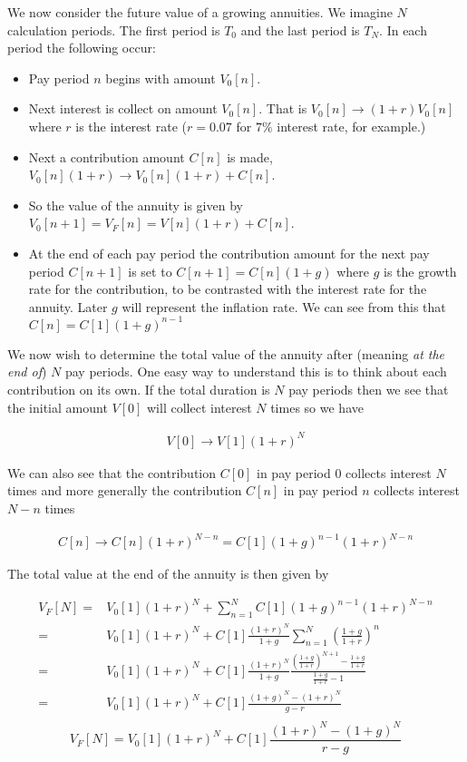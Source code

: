 \documentclass[12pt]{article}
\begin{document}
We now consider the future value of a growing annuities. 
We imagine $N$ calculation periods. 
The first period is $T_0$ and the last period is $T_N$. 
In each period the following occur:

\begin{itemize}
\item{Pay period $n$ begins with amount $V_0[n]$.}
\item{Next interest is collect on amount $V_0[n]$. That is $V_0[n] \rightarrow (1+r)V_0[n]$ where $r$ is the interest rate ($r=0.07$ for $7\%$ interest rate, for example.)}
\item{Next a contribution amount $C[n]$ is made, $V_0[n](1+r) \rightarrow V_0[n](1+r) + C[n]$.}
\item{So the value of the annuity is given by $V_0[n+1] = V_F[n] = V[n](1+r) + C[n]$.}
\item{At the end of each pay period the contribution amount for the next pay period $C[n+1]$ is set to $C[n+1] = C[n](1+g)$ where $g$ is the growth rate for the contribution, to be contrasted with the interest rate for the annuity. Later $g$ will represent the inflation rate. We can see from this that $C[n] = C[1](1+g)^{n-1}$}
\end{itemize}

We now wish to determine the total value of the annuity after (meaning \textit{at the end of}) $N$ pay periods. 
One easy way to understand this is to think about each contribution on its own.
If the total duration is $N$ pay periods then we see that the initial amount $V[0]$ will collect interest $N$ times so we have

\begin{align}
V[0] \rightarrow V[1](1+r)^N
\end{align}

We can also see that the contribution $C[0]$ in pay period $0$ collects interest $N$ times and more generally the contribution $C[n]$ in pay period $n$ collects interest $N-n$ times

\begin{align}
C[n] \rightarrow C[n](1+r)^{N-n} = C[1](1+g)^{n-1}(1+r)^{N-n}
\end{align}

The total value at the end of the annuity is then given by

\begin{align}
V_F[N] =& V_0[1](1+r)^N + \sum_{n=1}^N C[1](1+g)^{n-1}(1+r)^{N-n}\\
=& V_0[1](1+r)^N + C[1]\frac{(1+r)^N}{1+g}\sum_{n=1}^N \left(\frac{1+g}{1+r}\right)^n\\
=& V_0[1](1+r)^N + C[1]\frac{(1+r)^N}{1+g} \frac{\left(\frac{1+g}{1+r}\right)^{N+1} - \frac{1+g}{1+r}}{\frac{1+g}{1+r} - 1}\\
=& V_0[1](1+r)^N + C[1] \frac{(1+g)^N - (1+r)^N}{g-r}\\
\end{align}
\begin{equation}
\boxed{
V_F[N] = V_0[1](1+r)^N + C[1] \frac{(1+r)^N - (1+g)^N}{r-g}
}
\end{equation}
\end{document}
